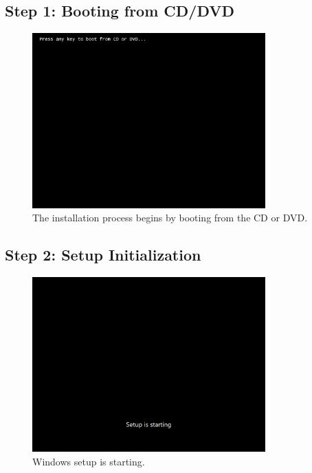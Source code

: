 \documentclass{article}
\begin{document}
\subsection{Step 1: Booting from CD/DVD}
\begin{figure}[H]
    \centering
    \includegraphics[width=0.8\textwidth]{2024-09-17_04-46-33.png}
    \caption{The installation process begins by booting from the CD or DVD.}
\end{figure}

\subsection{Step 2: Setup Initialization}
\begin{figure}[H]
    \centering
    \includegraphics[width=0.8\textwidth]{2024-09-17_04-47-12.png}
    \caption{Windows setup is starting.}
\end{figure}
\end{document}

